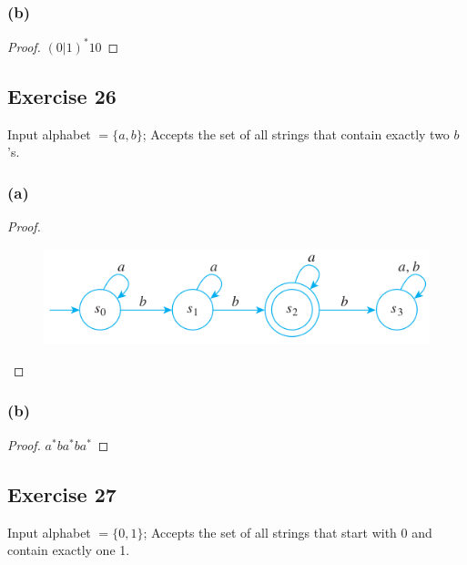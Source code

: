 \documentclass[14pt]{extarticle}
\begin{document}
\subsubsection{(b)}
\begin{proof}
\((0|1)^*10\)
\end{proof}

\subsection{Exercise 26}
Input alphabet \(= \{a, b\}\); Accepts the set of all strings that contain exactly two \(b\)’s.

\subsubsection{(a)}
\begin{proof}
\begin{figure}[ht!]
\centering
\includegraphics[scale=0.5]{../images/12.2.26.a.png}
\end{figure}
\end{proof}

\subsubsection{(b)}
\begin{proof}
\(a^*ba^*ba^*\)
\end{proof}

\subsection{Exercise 27}
Input alphabet \(= \{0, 1\}\); Accepts the set of all strings that start with 0 and contain exactly one 1.
\end{document}
